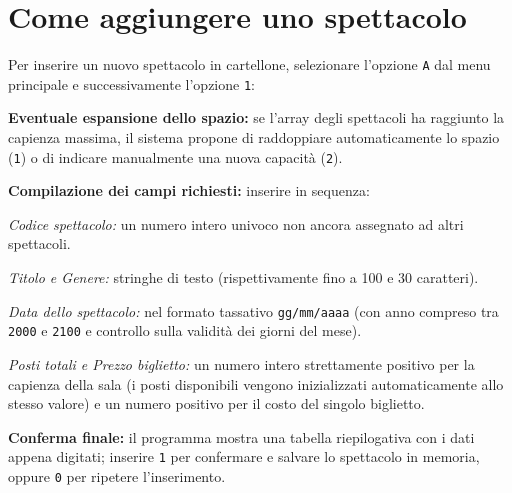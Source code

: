\documentclass[11pt,a4paper,oneside,openany]{book}
\newenvironment{listacomp}{%
    \small
    \begin{list}{\textendash}{%
        \setlength{\topsep}{2pt}%
        \setlength{\partopsep}{0pt}%
        \setlength{\itemsep}{1pt}%
        \setlength{\parsep}{0pt}%
        \setlength{\leftmargin}{1.2em}%
    }%
}{%
    \end{list}%
}
\begin{document}
\section{Come aggiungere uno spettacolo}
Per inserire un nuovo spettacolo in cartellone, selezionare l'opzione \texttt{A} dal menu principale e successivamente l'opzione \texttt{1}:
\begin{listacomp}
    \item \textbf{Eventuale espansione dello spazio:} se l'array degli spettacoli ha raggiunto la capienza massima, il sistema propone di raddoppiare automaticamente lo spazio (\texttt{1}) o di indicare manualmente una nuova capacità (\texttt{2}).
    \item \textbf{Compilazione dei campi richiesti:} inserire in sequenza:
    \begin{listacomp}
        \item \emph{Codice spettacolo:} un numero intero univoco non ancora assegnato ad altri spettacoli.
        \item \emph{Titolo e Genere:} stringhe di testo (rispettivamente fino a 100 e 30 caratteri).
        \item \emph{Data dello spettacolo:} nel formato tassativo \texttt{gg/mm/aaaa} (con anno compreso tra \texttt{2000} e \texttt{2100} e controllo sulla validità dei giorni del mese).
        \item \emph{Posti totali e Prezzo biglietto:} un numero intero strettamente positivo per la capienza della sala (i posti disponibili vengono inizializzati automaticamente allo stesso valore) e un numero positivo per il costo del singolo biglietto.
    \end{listacomp}
    \item \textbf{Conferma finale:} il programma mostra una tabella riepilogativa con i dati appena digitati; inserire \texttt{1} per confermare e salvare lo spettacolo in memoria, oppure \texttt{0} per ripetere l'inserimento.
\end{listacomp}

\end{document}
